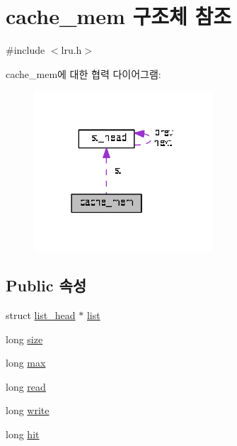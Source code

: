 \hypertarget{structcache__mem}{\section{cache\+\_\+mem 구조체 참조}
\label{structcache__mem}
}


{\ttfamily \#include $<$lru.\+h$>$}



cache\+\_\+mem에 대한 협력 다이어그램\+:
\nopagebreak
\begin{figure}[H]
\begin{center}
\leavevmode
\includegraphics[width=190pt]{structcache__mem__coll__graph}
\end{center}
\end{figure}
\subsection*{Public 속성}
\begin{DoxyCompactItemize}
\item 
struct \hyperlink{structlist__head}{list\+\_\+head} $\ast$ \hyperlink{structcache__mem_a785dde86afb87f8825779f50e29d6bd7}{list}
\item 
long \hyperlink{structcache__mem_a58c6a91c40d59398a3ed18daccc448fc}{size}
\item 
long \hyperlink{structcache__mem_aca41dfab3073387e6c6063457a17f616}{max}
\item 
long \hyperlink{structcache__mem_af64061b621392a1872f5cb92dde7dc7c}{read}
\item 
long \hyperlink{structcache__mem_adb5a0315176779908235c7ed3e41ec57}{write}
\item 
long \hyperlink{structcache__mem_a2b8742701cf4beaff0639d36d52209d9}{hit}
\end{DoxyCompactItemize}


